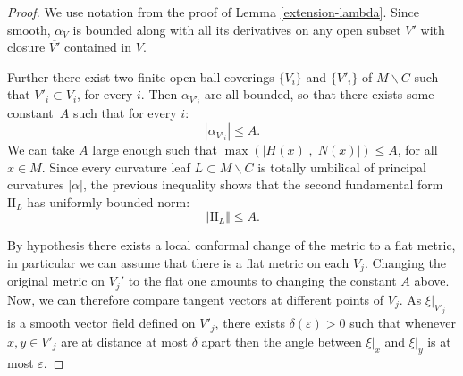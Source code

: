 \documentclass[JEP,XML,SOM,Unicode]{cedram}
\let\moins\smallsetminus
\newcommand{\II}{\mathrm{II}}
\let\parallel\Vert
\theoremstyle{definition}
\theoremstyle{remark}
\numberwithin{equation}{section}
\begin{document}
\begin{proof}
We use notation from the proof of Lemma \ref{extension-lambda}.
Since smooth, $\alpha_V$ is bounded along with all its derivatives on any open subset $V'$ with closure $\overline{V'}$ contained in $V$.

Further there exist two finite open ball coverings $\{V_i\}$ and $\{V'_i\}$ of $\overline{M\moins C}$ such that
$\overline{V'_i}\subset V_i$, for every $i$. Then $\alpha_{V'_i}$ are all bounded, so that there exists some
constant~$A$ such that for every $i$:
\[ |\alpha_{V'_i}| \leq A.\]
We can take $A$ large enough such that $\max(|H(x)|, |N(x)|) \leq A$, for all $x\in M$.
Since every curvature leaf $L\subset M\moins C$ is totally umbilical of principal curvatures $|\alpha|$, the previous inequality shows that
the second fundamental form $\II_{L}$ has uniformly bounded norm:
\[ \parallel \II_{L} \parallel \leq A.\]

By hypothesis there exists a local conformal change of the metric to a flat metric, in particular we can assume that
there is a flat metric on each $V_j$. Changing the original metric on $V_j'$ to the flat one amounts
to changing the constant $A$ above. Now, we can therefore compare tangent vectors at different points of $V_j$.
As $\xi|_{V'_j}$ is a smooth vector field defined on $V'_j$, there exists $\delta(\varepsilon)>0$ such that
whenever $x,y\in V'_j$ are at distance at most $\delta$ apart then the angle between
$\xi|_x$ and $\xi|_y$ is at most $\varepsilon$.


\end{proof}
\end{document}
